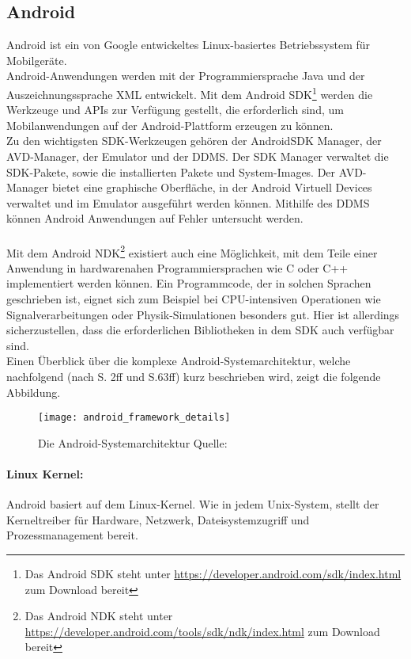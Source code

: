 \subsection{Android}
Android ist ein von Google entwickeltes Linux-basiertes Betriebssystem für Mobilgeräte.\\ 
Android-Anwendungen werden mit der Programmiersprache Java und der Auszeichnungssprache \gls{XML} entwickelt. Mit dem Android \gls{SDK}\footnote{ Das Android \gls{SDK} steht unter \url{https://developer.android.com/sdk/index.html} zum Download bereit} werden die Werkzeuge und \glspl{API} zur Verfügung gestellt, die erforderlich sind, um Mobilanwendungen auf der Android-Plattform erzeugen zu können.\\ 
Zu den wichtigsten \gls{SDK}-Werkzeugen gehören der Android\gls{SDK} Manager, der AVD-Manager, der Emulator und der \gls{DDMS}. Der \gls{SDK} Manager verwaltet die \gls{SDK}-Pakete, sowie die installierten Pakete und System-Images. Der AVD-Manager bietet eine graphische Oberfläche, in der Android Virtuell Devices verwaltet und im Emulator ausgeführt werden können. Mithilfe des \gls{DDMS} können Android Anwendungen auf Fehler untersucht werden. \cite{android_sdk} \\\\
Mit dem Android \gls{NDK}\footnote{ Das Android \gls{NDK} steht unter \url{https://developer.android.com/tools/sdk/ndk/index.html} zum Download bereit} existiert auch eine Möglichkeit, mit dem Teile einer Anwendung in hardwarenahen Programmiersprachen wie C oder C++ implementiert werden können. Ein Programmcode, der in solchen Sprachen geschrieben ist, eignet sich zum Beispiel bei CPU-intensiven Operationen wie Signalverarbeitungen oder Physik-Simulationen besonders gut. Hier ist allerdings sicherzustellen, dass die erforderlichen Bibliotheken in dem \gls{SDK} auch verfügbar sind. \cite{android_ndk} \\
Einen Überblick über die komplexe Android-Systemarchitektur, welche nachfolgend (nach \cite{android} S. 2ff und \cite{androidVM} S.63ff) kurz beschrieben wird, zeigt die folgende Abbildung.\\
\begin{figure}[H]  
    \centering  
    \texttt{[image: android\_framework\_details]} 
    \grayRule
    \caption[Android-Systemarchitektur]{Die Android-Systemarchitektur Quelle: \cite{android_fig}}
    \label{fig:android}
\end{figure}
\paragraph{Linux Kernel: }
Android basiert auf dem Linux-Kernel. Wie in jedem Unix-System, stellt der Kerneltreiber für Hardware, Netzwerk, Dateisystemzugriff und Prozessmanagement bereit.

